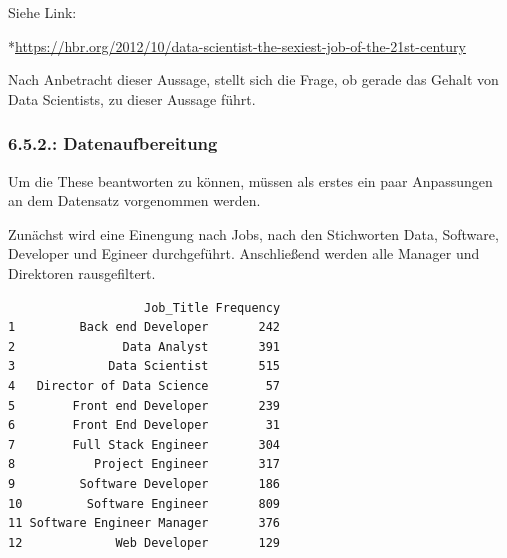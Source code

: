 \documentclass[
  letterpaper,
  DIV=11,
  numbers=noendperiod]{scrartcl}
\newenvironment{Shaded}{\begin{snugshade}}{\end{snugshade}}
\newcommand{\AttributeTok}[1]{\textcolor[rgb]{0.40,0.45,0.13}{#1}}
\newcommand{\FunctionTok}[1]{\textcolor[rgb]{0.28,0.35,0.67}{#1}}
\newcommand{\NormalTok}[1]{\textcolor[rgb]{0.00,0.23,0.31}{#1}}
\newcommand{\OtherTok}[1]{\textcolor[rgb]{0.00,0.23,0.31}{#1}}
\newcommand{\SpecialCharTok}[1]{\textcolor[rgb]{0.37,0.37,0.37}{#1}}
\newcommand{\StringTok}[1]{\textcolor[rgb]{0.13,0.47,0.30}{#1}}
\begin{document}
Siehe Link:

*\url{https://hbr.org/2012/10/data-scientist-the-sexiest-job-of-the-21st-century}

Nach Anbetracht dieser Aussage, stellt sich die Frage, ob gerade das
Gehalt von Data Scientists, zu dieser Aussage führt.

\hypertarget{datenaufbereitung}{%
\subsubsection{6.5.2.: Datenaufbereitung}\label{datenaufbereitung}}

Um die These beantworten zu können, müssen als erstes ein paar
Anpassungen an dem Datensatz vorgenommen werden.

Zunächst wird eine Einengung nach Jobs, nach den Stichworten Data,
Software, Developer und Egineer durchgeführt. Anschließend werden alle
Manager und Direktoren rausgefiltert.

\begin{Shaded}
\end{Shaded}

\begin{verbatim}
                   Job_Title Frequency
1         Back end Developer       242
2               Data Analyst       391
3             Data Scientist       515
4   Director of Data Science        57
5        Front end Developer       239
6        Front End Developer        31
7        Full Stack Engineer       304
8           Project Engineer       317
9         Software Developer       186
10         Software Engineer       809
11 Software Engineer Manager       376
12             Web Developer       129
\end{verbatim}
\end{document}
